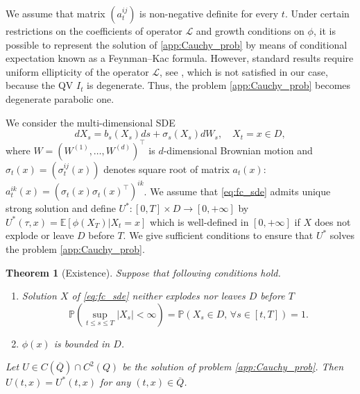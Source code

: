 \documentclass[pdftex,11pt,a4paper] {article}
\newtheorem{theorem}{Theorem}[section]
\begin{document}
We assume that  matrix $(a_t^{ij})$ is non-negative definite for every $t$.
Under certain restrictions on the coefficients of operator $\mathcal{L}$ and growth conditions on $\phi$, it is possible to  represent the solution of \eqref{app:Cauchy_prob} by means of conditional expectation known as a Feynman--Kac formula. However, standard results require uniform ellipticity of the operator $\mathcal{L}$, see \cite{Friedman75}, which is not satisfied in our case, because the QV $I_{t}$ is degenerate. Thus, the problem \eqref{app:Cauchy_prob} becomes degenerate parabolic one.  

We consider the multi-dimensional SDE
\begin{equation}\label{eq:fc_sde}
dX_s=b_s(X_s)ds + \sigma_s(X_s)dW_s,\quad X_t=x\in D,
\end{equation}
where $W=(W^{(1)},\ldots, W^{(d)})^\top$ is $d$-dimensional Brownian motion and  $\sigma_t(x)=(\sigma^{ij}_t(x))$ denotes square root of matrix $a_t(x)$: $a^{ik}_t(x)=\left(\sigma_t(x)\sigma_t(x)^\top\right)^{ik}$.
We assume that \eqref{eq:fc_sde} admits unique strong solution and define $U^*: [0,T]\times D\to [0, +\infty]$ by
$
U^*(\tau,x)=\mathbb{E}\left[\left.\phi(X_T)\right|X_t=x\right]
$
which is well-defined in $[0,+\infty]$ if $X$ does not explode or leave $D$ before $T$. 
We give sufficient conditions to ensure that $U^*$ solves the problem \eqref{app:Cauchy_prob}. 

\begin{theorem}[Existence]\label{thm:fc_exten}
Suppose that following conditions hold.
\begin{enumerate}%
\item\label{fc:explosion} Solution $X$ of \eqref{eq:fc_sde} neither explodes nor leaves $D$ before $T$
\begin{equation*}
\mathbb{P}\left(\sup_{t\le s\le T}|X_s|<\infty\right)=\mathbb{P}\left(X_s\in D,\, \forall s\in [t,T]\right)=1.
\end{equation*}
\item\label{fc:bounded} $\phi(x)$ is bounded in $D$.
\end{enumerate}
Let $U\in C(\overline{Q})\cap C^2(Q)$ be the solution of problem \eqref{app:Cauchy_prob}. Then $U(t,x)=U^*(t,x)$ for any $(t,x)\in \overline{Q}$. 
\end{theorem}
\end{document}
